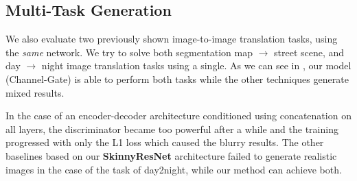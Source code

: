 
\subsection{Multi-Task Generation }
We also evaluate two previously shown image-to-image translation tasks, using the {\em same} network. 
We try to solve both segmentation map $\rightarrow$ street scene, and day $\rightarrow$ night image translation tasks using a single. 
As we can see in , our model (Channel-Gate) is able to perform both tasks while the other techniques generate mixed results. 

In the case of an encoder-decoder architecture \cite{huang2018multimodal} conditioned using concatenation on all layers, the discriminator became too powerful after a while and the training progressed with only the L1 loss which caused the blurry results. The other baselines based on our \textbf{SkinnyResNet} architecture failed to generate realistic images in the case of the task of day2night, while our method can achieve both.



